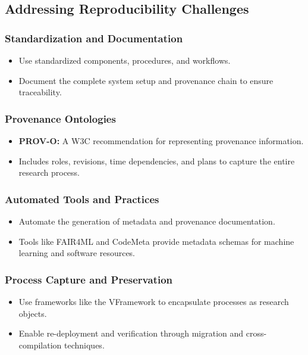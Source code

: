 \subsection{Addressing Reproducibility Challenges}
\subsubsection{Standardization and Documentation}
\begin{itemize}
    \item Use standardized components, procedures, and workflows.
    \item Document the complete system setup and provenance chain to ensure traceability.
\end{itemize}

\subsubsection{Provenance Ontologies}
\begin{itemize}
    \item \textbf{PROV-O:} A W3C recommendation for representing provenance information.
    \item Includes roles, revisions, time dependencies, and plans to capture the entire research process.
\end{itemize}

\subsubsection{Automated Tools and Practices}
\begin{itemize}
    \item Automate the generation of metadata and provenance documentation.
    \item Tools like FAIR4ML and CodeMeta provide metadata schemas for machine learning and software resources.
\end{itemize}

\subsubsection{Process Capture and Preservation}
\begin{itemize}
    \item Use frameworks like the VFramework to encapsulate processes as research objects.
    \item Enable re-deployment and verification through migration and cross-compilation techniques.
\end{itemize}

